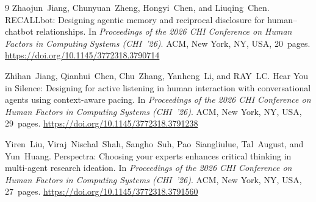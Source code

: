 \documentclass[manuscript,screen]{acmart}
\begin{document}
\begin{thebibliography}{9}
Zhaojun~Jiang, Chunyuan~Zheng, Hongyi~Chen, and Liuqing~Chen.
\newblock RECALLbot: Designing agentic memory and reciprocal disclosure for
human--chatbot relationships.
\newblock In \emph{Proceedings of the 2026 CHI Conference on Human Factors in
Computing Systems (CHI~'26)}. ACM, New York, NY, USA, 20~pages.
\newblock \url{https://doi.org/10.1145/3772318.3790714}

Zhihan~Jiang, Qianhui~Chen, Chu~Zhang, Yanheng~Li, and RAY~LC.
\newblock Hear You in Silence: Designing for active listening in human interaction
with conversational agents using context-aware pacing.
\newblock In \emph{Proceedings of the 2026 CHI Conference on Human Factors in
Computing Systems (CHI~'26)}. ACM, New York, NY, USA, 29~pages.
\newblock \url{https://doi.org/10.1145/3772318.3791238}

Yiren~Liu, Viraj~Nischal~Shah, Sangho~Suh, Pao~Siangliulue, Tal~August, and
Yun~Huang.
\newblock Perspectra: Choosing your experts enhances critical thinking in multi-agent
research ideation.
\newblock In \emph{Proceedings of the 2026 CHI Conference on Human Factors in
Computing Systems (CHI~'26)}. ACM, New York, NY, USA, 27~pages.
\newblock \url{https://doi.org/10.1145/3772318.3791560}
\end{thebibliography}
\end{document}
